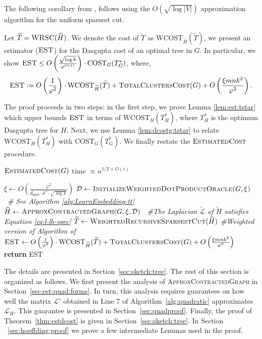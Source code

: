 \documentclass[letterpaper,11pt]{article}
\newcommand{\CT}{\text{COST}}
\newcommand{\wCT}{\text{WCOST}}
\newcommand{\est}{O\left(\frac{1}{\varphi^2}\right)\cdot  \wCT_{\wt{H}}(\wt{T}) + \textsc{TotalClustersCost}(G)+ O\left(\frac{\xi m n k^2 }{\varphi^2} \right) }
\newcommand{\eqdef}{:=}
\newcommand{\estg}{\textsc{EST}}
\newcommand{\cL}{\mathcal{L}}
\theoremstyle{plain}
\theoremstyle{definition}
\theoremstyle{remark}
\newcommand{\wt}[1]{\widetilde{#1}}
\newcommand{\return}{\textbf{return }}
\begin{document}
\charikarthm*

The following corollary from \cite{charikar2017approximate},  follows using the $O(\sqrt{\log |V|})$ approximation algorithm for the uniform sparsest cut.
\charikarcor*
\wcharikarcor*

Let $\widetilde{T}=\textsc{WRSC}(\widetilde{H})$. We denote the cost of $\wt{T}$ as $\wCT_{\wt{H}}(\wt{T})$, we present an estimator ($\estg$) 
for the Dasgupta cost of an optimal tree in $G$. In particular, we show $\estg \leq O\left( \frac{\sqrt{\log k}}{\varphi^{O(1)}} \right) \cdot \CT_G(T^*_G)$, where, 
$$\estg \eqdef \est \text{.}$$

The proof proceeds in two steps: in the first step, we prove Lemma \ref{lem:est:tstar}
which upper bounds $\estg$ in terms of $\wCT_H(T^*_H)$, 
where $T^*_{H}$ is the optimum Dasgupta tree for $H$. 
Next, we use Lemma \ref{lem:dcostg:tstar} to relate $\wCT_H(T^*_H)$ with $\CT_G(T^*_G)$. We finally restate the $\textsc{EstimatedCost}$ procedure.
\begin{algorithm}[H]
\caption{$\textsc{EstimatedCost}(G)$ {\qquad  \qquad\qquad\qquad\qquad \qquad \qquad \qquad  time  $\approx n^{1/2+O(\epsilon)}$}}
\label{alg:tree}
\begin{algorithmic}[1]
\STATE $\xi \gets O\left(\frac{\varphi^2}{d_{\max}\cdot k^3\cdot \sqrt{\log k}}\right)$ \label{setxi}
\STATE $\mathcal{D} \gets \textsc{InitializeWeightedDotProductOracle($G,\xi$)}$ \textit{\qquad\qquad\ \qquad \quad  \# See Algorithm \ref{alg:LearnEmbedding-tt}}
\STATE $\widetilde{H} \gets\textsc{ApproxContractedGraph}(G, \xi,\mathcal{D})$ \textit{\quad \ \#The Laplacian $\widetilde{\mathcal{L}}$ of $\widetilde{H}$ satisfies Equation \eqref{eq:l-lh-spec}}
\STATE $\widetilde{T} \gets \textsc{WeightedRecursiveSparsestCut}(\widetilde H)$ \textit{\qquad  \#Weighted version of Algorithm of~\cite{charikar2017approximate}}
\STATE $\estg \gets \est$ \label{ln:est-set}
\STATE \return \estg
\end{algorithmic}
\end{algorithm}

The details are presented in Section~\ref{sec:sketch:tree}. The rest of this section is organized as follows. We first present the analysis of \textsc{ApproxContractedGraph} in Section~\ref{sec:est:quad:forms}. In turn, this analysis requires guarantees on how well the matrix $\cL'$ obtained in Line 7 of Algorithm~\ref{alg:quadratic} approximates $\cL_H$. This guarantee is presented in Section~\ref{sec:quadproof}. 
 Finally, the proof of Theorem~\ref{thm:estdcost} is given in Section~\ref{sec:sketch:tree}. In Section ~\ref{sec:hoeffding:proof} we prove a few intermediate Lemmas used in the proof. 
\end{document}
